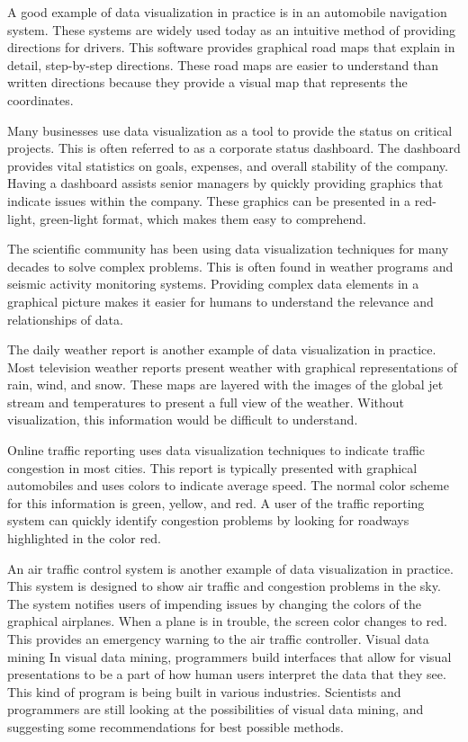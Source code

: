 A good example of data visualization in practice is in an automobile navigation system. These systems are widely used today as an intuitive method of providing directions for drivers. This software provides graphical road maps that explain in detail, step-by-step directions. These road maps are easier to understand than written directions because they provide a visual map that represents the coordinates.

Many businesses use data visualization as a tool to provide the status on critical projects. This is often referred to as a corporate status dashboard. The dashboard provides vital statistics on goals, expenses, and overall stability of the company. Having a dashboard assists senior managers by quickly providing graphics that indicate issues within the company. These graphics can be presented in a red-light, green-light format, which makes them easy to comprehend.

The scientific community has been using data visualization techniques for many decades to solve complex problems. This is often found in weather programs and seismic activity monitoring systems. Providing complex data elements in a graphical picture makes it easier for humans to understand the relevance and relationships of data.

The daily weather report is another example of data visualization in practice. Most television weather reports present weather with graphical representations of rain, wind, and snow. These maps are layered with the images of the global jet stream and temperatures to present a full view of the weather. Without visualization, this information would be difficult to understand.

Online traffic reporting uses data visualization techniques to indicate traffic congestion in most cities. This report is typically presented with graphical automobiles and uses colors to indicate average speed. The normal color scheme for this information is green, yellow, and red. A user of the traffic reporting system can quickly identify congestion problems by looking for roadways highlighted in the color red.

An air traffic control system is another example of data visualization in practice. This system is designed to show air traffic and congestion problems in the sky. The system notifies users of impending issues by changing the colors of the graphical airplanes. When a plane is in trouble, the screen color changes to red. This provides an emergency warning to the air traffic controller.
Visual data mining
In visual data mining, programmers build interfaces that allow for visual presentations to be a part of how human users interpret the data that they see. This kind of program is being built in various industries. Scientists and programmers are still looking at the possibilities of visual data mining, and suggesting some recommendations for best possible methods.

